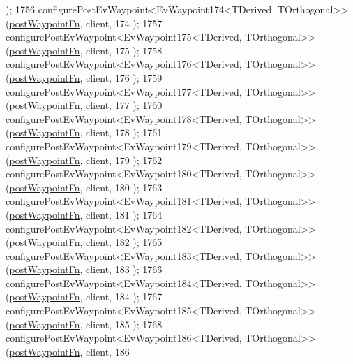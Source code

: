 \begin{DoxyCode}
      );
1756     configurePostEvWaypoint<EvWaypoint174<TDerived, TOrthogonal>>(\hyperlink{classcl__move__base__z_1_1WaypointEventDispatcher_a964a57fcce5d48ec60243230722d8dd7}{postWaypointFn}, client, 174
      );
1757     configurePostEvWaypoint<EvWaypoint175<TDerived, TOrthogonal>>(\hyperlink{classcl__move__base__z_1_1WaypointEventDispatcher_a964a57fcce5d48ec60243230722d8dd7}{postWaypointFn}, client, 175
      );
1758     configurePostEvWaypoint<EvWaypoint176<TDerived, TOrthogonal>>(\hyperlink{classcl__move__base__z_1_1WaypointEventDispatcher_a964a57fcce5d48ec60243230722d8dd7}{postWaypointFn}, client, 176
      );
1759     configurePostEvWaypoint<EvWaypoint177<TDerived, TOrthogonal>>(\hyperlink{classcl__move__base__z_1_1WaypointEventDispatcher_a964a57fcce5d48ec60243230722d8dd7}{postWaypointFn}, client, 177
      );
1760     configurePostEvWaypoint<EvWaypoint178<TDerived, TOrthogonal>>(\hyperlink{classcl__move__base__z_1_1WaypointEventDispatcher_a964a57fcce5d48ec60243230722d8dd7}{postWaypointFn}, client, 178
      );
1761     configurePostEvWaypoint<EvWaypoint179<TDerived, TOrthogonal>>(\hyperlink{classcl__move__base__z_1_1WaypointEventDispatcher_a964a57fcce5d48ec60243230722d8dd7}{postWaypointFn}, client, 179
      );
1762     configurePostEvWaypoint<EvWaypoint180<TDerived, TOrthogonal>>(\hyperlink{classcl__move__base__z_1_1WaypointEventDispatcher_a964a57fcce5d48ec60243230722d8dd7}{postWaypointFn}, client, 180
      );
1763     configurePostEvWaypoint<EvWaypoint181<TDerived, TOrthogonal>>(\hyperlink{classcl__move__base__z_1_1WaypointEventDispatcher_a964a57fcce5d48ec60243230722d8dd7}{postWaypointFn}, client, 181
      );
1764     configurePostEvWaypoint<EvWaypoint182<TDerived, TOrthogonal>>(\hyperlink{classcl__move__base__z_1_1WaypointEventDispatcher_a964a57fcce5d48ec60243230722d8dd7}{postWaypointFn}, client, 182
      );
1765     configurePostEvWaypoint<EvWaypoint183<TDerived, TOrthogonal>>(\hyperlink{classcl__move__base__z_1_1WaypointEventDispatcher_a964a57fcce5d48ec60243230722d8dd7}{postWaypointFn}, client, 183
      );
1766     configurePostEvWaypoint<EvWaypoint184<TDerived, TOrthogonal>>(\hyperlink{classcl__move__base__z_1_1WaypointEventDispatcher_a964a57fcce5d48ec60243230722d8dd7}{postWaypointFn}, client, 184
      );
1767     configurePostEvWaypoint<EvWaypoint185<TDerived, TOrthogonal>>(\hyperlink{classcl__move__base__z_1_1WaypointEventDispatcher_a964a57fcce5d48ec60243230722d8dd7}{postWaypointFn}, client, 185
      );
1768     configurePostEvWaypoint<EvWaypoint186<TDerived, TOrthogonal>>(\hyperlink{classcl__move__base__z_1_1WaypointEventDispatcher_a964a57fcce5d48ec60243230722d8dd7}{postWaypointFn}, client, 186

\end{DoxyCode}
